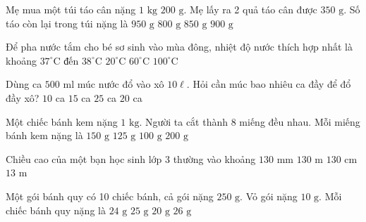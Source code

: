 \begin{ex} %
Mẹ mua một túi táo cân nặng $1\text{ kg } 200\text{ g}$. Mẹ lấy ra 2 quả táo cân được $350\text{ g}$. Số táo còn lại trong túi nặng là
\choice
{$950\text{ g}$}
{$800\text{ g}$}
{\True $850\text{ g}$}
{$900\text{ g}$}
\end{ex}

\begin{ex} %
Để pha nước tắm cho bé sơ sinh vào mùa đông, nhiệt độ nước thích hợp nhất là khoảng
\choice
{\True $37^\circ\text{C} \text{ đến } 38^\circ\text{C}$}
{$20^\circ\text{C}$}
{$60^\circ\text{C}$}
{$100^\circ\text{C}$}
\end{ex}

\begin{ex} %
Dùng ca $500\text{ ml}$ múc nước đổ vào xô $10\ell$. Hỏi cần múc bao nhiêu ca đầy để đổ đầy xô?
\choice
{$10$ ca}
{$15$ ca}
{$25$ ca}
{\True $20$ ca}
\end{ex}

\begin{ex} %
Một chiếc bánh kem nặng $1\text{ kg}$. Người ta cắt thành 8 miếng đều nhau. Mỗi miếng bánh kem nặng là
\choice
{$150\text{ g}$}
{\True $125\text{ g}$}
{$100\text{ g}$}
{$200\text{ g}$}
\end{ex}

\begin{ex} %
Chiều cao của một bạn học sinh lớp 3 thường vào khoảng
\choice
{$130\text{ mm}$}
{$130\text{ m}$}
{\True $130\text{ cm}$}
{$13\text{ m}$}
\end{ex}

\begin{ex} %
Một gói bánh quy có 10 chiếc bánh, cả gói nặng $250\text{ g}$. Vỏ gói nặng $10\text{ g}$. Mỗi chiếc bánh quy nặng là
\choice
{\True $24\text{ g}$}
{$25\text{ g}$}
{$20\text{ g}$}
{$26\text{ g}$}
\end{ex}

